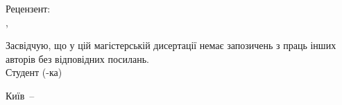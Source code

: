 
\medskip
\noindent Рецензент:\\
\reviewerRegalia,\\
\reviewerFullName \hfill \hrulefill

\vspace{2em}
\noindent Засвідчую, що у цій магістерській дисертації немає
запозичень з праць інших авторів без відповідних посилань.\\
Студент (-ка) \hrulefill

\vfill
\begin{center}
  Київ~--~\thesisYear
\end{center}

\clearpage
